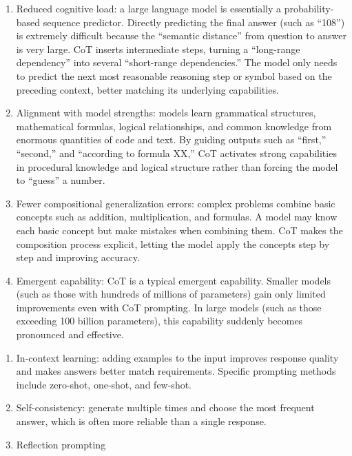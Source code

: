 \begin{enumerate}
\def\labelenumi{(\arabic{enumi})}
\item
  Reduced cognitive load: a large language model is essentially a probability-based sequence predictor. Directly predicting the final answer (such as ``108'') is extremely difficult because the ``semantic distance'' from question to answer is very large. CoT inserts intermediate steps, turning a ``long-range dependency'' into several ``short-range dependencies.'' The model only needs to predict the next most reasonable reasoning step or symbol based on the preceding context, better matching its underlying capabilities.
\item
  Alignment with model strengths: models learn grammatical structures, mathematical formulas, logical relationships, and common knowledge from enormous quantities of code and text. By guiding outputs such as ``first,'' ``second,'' and ``according to formula XX,'' CoT activates strong capabilities in procedural knowledge and logical structure rather than forcing the model to ``guess'' a number.
\item
  Fewer compositional generalization errors: complex problems combine basic concepts such as addition, multiplication, and formulas. A model may know each basic concept but make mistakes when combining them. CoT makes the composition process explicit, letting the model apply the concepts step by step and improving accuracy.
\item
  Emergent capability: CoT is a typical emergent capability. Smaller models (such as those with hundreds of millions of parameters) gain only limited improvements even with CoT prompting. In large models (such as those exceeding 100 billion parameters), this capability suddenly becomes pronounced and effective.
\end{enumerate}

\begin{enumerate}
\def\labelenumi{\arabic{enumi}.}
\setcounter{enumi}{1}
\item
  In-context learning: adding examples to the input improves response quality and makes answers better match requirements. Specific prompting methods include zero-shot, one-shot, and few-shot.
\item
  Self-consistency: generate multiple times and choose the most frequent answer, which is often more reliable than a single response.
\item
  Reflection prompting
\end{enumerate}

